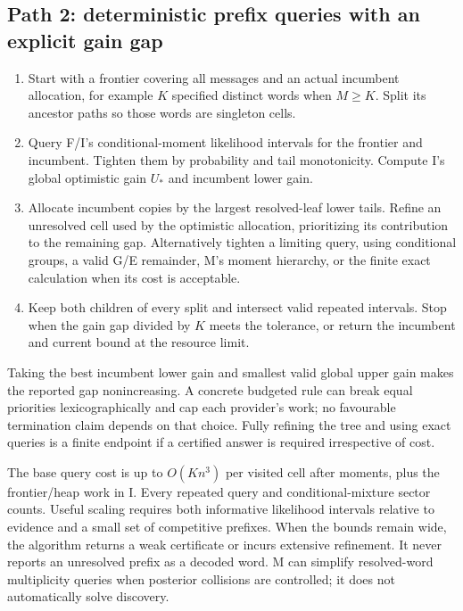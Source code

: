 \documentclass[10pt,a4paper]{article}
\begin{document}
\subsection{Path 2: deterministic prefix queries with an explicit gain gap}
\begin{enumerate}
\item Start with a frontier covering all messages and an actual incumbent allocation, for example $K$
      specified distinct words when $M\geq K$. Split its ancestor paths so those words are singleton cells.
\item Query F/I's conditional-moment likelihood intervals for the frontier and incumbent. Tighten them by
      probability and tail monotonicity. Compute I's global optimistic gain $U_*$ and incumbent lower gain.
\item Allocate incumbent copies by the largest resolved-leaf lower tails. Refine an unresolved cell used
      by the optimistic allocation, prioritizing its contribution to the remaining gap. Alternatively
      tighten a limiting query, using conditional groups, a valid G/E remainder, M's moment hierarchy,
      or the finite exact calculation when its cost is acceptable.
\item Keep both children of every split and intersect valid repeated intervals. Stop when the gain gap
      divided by $K$ meets the tolerance, or return the incumbent and current bound at the resource limit.
\end{enumerate}
Taking the best incumbent lower gain and smallest valid global upper gain makes the reported gap
nonincreasing. A concrete budgeted rule can break equal priorities lexicographically and cap each provider's
work; no favourable termination claim depends on that choice. Fully refining the tree and using exact
queries is a finite endpoint if a certified answer is required irrespective of cost.

The base query cost is up to $O(Kn^3)$ per visited cell after moments, plus the frontier/heap work in I.
Every repeated query and conditional-mixture sector counts. Useful scaling requires both informative
likelihood intervals relative to evidence and a small set of competitive prefixes. When the bounds remain
wide, the algorithm returns a weak certificate or incurs extensive refinement. It never reports an
unresolved prefix as a decoded word. M can simplify resolved-word multiplicity queries when posterior
collisions are controlled; it does not automatically solve discovery.
\end{document}
